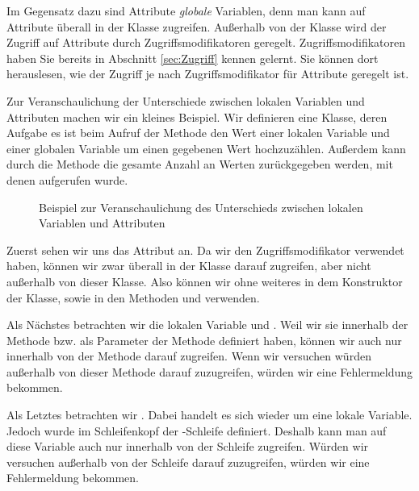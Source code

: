 \documentclass{tuda-pub}
\begin{document}
  Im Gegensatz dazu sind Attribute \emph{globale} Variablen, denn man kann auf Attribute überall
  in der Klasse zugreifen. Außerhalb von der Klasse wird der Zugriff auf Attribute durch
  Zugriffsmodifikatoren geregelt. Zugriffsmodifikatoren haben Sie bereits in Abschnitt
  \ref{sec:Zugriff} kennen gelernt. Sie können dort herauslesen, wie der Zugriff je nach
  Zugriffsmodifikator für Attribute geregelt ist.

  \br

  Zur Veranschaulichung der Unterschiede zwischen lokalen Variablen und
  Attributen machen wir ein kleines Beispiel. Wir definieren eine Klasse, deren Aufgabe es ist
  beim Aufruf der Methode  den Wert einer lokalen Variable und einer globalen
  Variable um einen gegebenen Wert hochzuzählen. Außerdem kann durch die Methode
   die gesamte Anzahl an Werten zurückgegeben werden, mit denen
   aufgerufen wurde.

  \begin{figure}[h]
    \centering
    
    \caption{Beispiel zur Veranschaulichung des Unterschieds zwischen lokalen Variablen und
    Attributen}
  \end{figure}

  Zuerst sehen wir uns das Attribut  an. Da wir den Zugriffsmodifikator
   verwendet haben, können wir zwar überall in der Klasse 
  darauf zugreifen, aber nicht außerhalb von dieser Klasse. Also können wir 
  ohne weiteres in dem Konstruktor der Klasse, sowie in den Methoden  und
   verwenden.

  \br

  Als Nächstes betrachten wir die lokalen Variable  und 
  . Weil wir sie innerhalb der Methode bzw. als Parameter der Methode definiert haben, können wir
  auch nur innerhalb von der Methode  darauf zugreifen. Wenn wir versuchen
  würden außerhalb von dieser Methode darauf zuzugreifen, würden wir eine Fehlermeldung bekommen.

  \br

  Als Letztes betrachten wir . Dabei handelt es sich wieder um eine lokale Variable.
  Jedoch wurde  im Schleifenkopf der -Schleife definiert. Deshalb
  kann man auf diese Variable auch nur innerhalb von der Schleife zugreifen. Würden wir versuchen
  außerhalb von der Schleife darauf zuzugreifen, würden wir eine Fehlermeldung bekommen.
\end{document}
